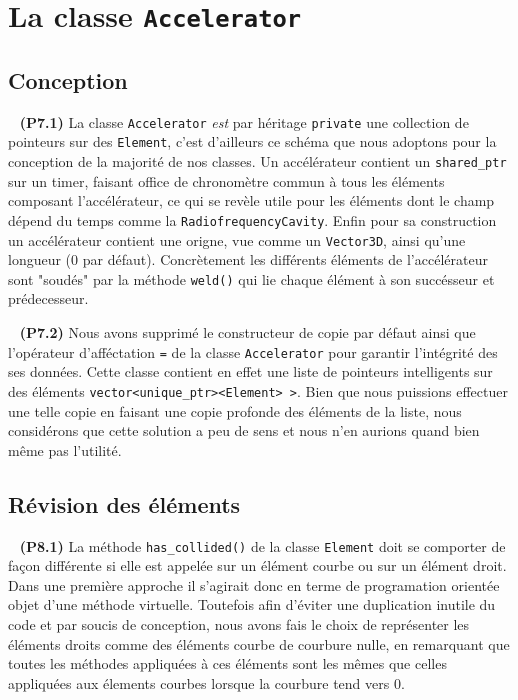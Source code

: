 \documentclass[12pt, letterpaper, twoside]{article}
\newcommand{\T}[1]{\texttt{#1}}
\begin{document}
\section{La classe \T{Accelerator}}

\subsection{Conception}

\ \linebreak
\noindent \textbf{(P7.1)} La classe \T{Accelerator} \emph{est} par héritage \T{private} une collection de pointeurs sur des \T{Element}, c'est d'ailleurs ce schéma que nous adoptons pour la conception de la majorité de nos classes. Un accélérateur contient un \T{shared\_ptr} sur un timer, faisant office de chronomètre commun à tous les éléments composant l'accélérateur, ce qui se revèle utile pour les éléments dont le champ dépend du temps comme la \T{RadiofrequencyCavity}. Enfin pour sa construction un accélérateur contient une origne, vue comme un \T{Vector3D}, ainsi qu'une longueur (0 par défaut). Concrètement les différents éléments de l'accélérateur sont "soudés" par la méthode \T{weld()} qui lie chaque élément à son succésseur et prédecesseur.

\ \linebreak
\noindent \textbf{(P7.2)} Nous avons supprimé le constructeur de copie par défaut ainsi que l'opérateur d'afféctation \T{=} de la classe \T{Accelerator} pour garantir l'intégrité des ses données. Cette classe contient en effet une liste de pointeurs intelligents sur des éléments \T{vector<unique\_ptr><Element> >}. Bien que nous puissions effectuer une telle copie en faisant une copie profonde des éléments de la liste, nous considérons que cette solution a peu de sens et nous n'en aurions quand bien même pas l'utilité. 

\subsection{Révision des éléments}

\ \linebreak
\noindent \textbf{(P8.1)} La méthode \T{has\_collided()} de la classe \T{Element} doit se comporter de façon différente si elle est appelée sur un élément courbe ou sur un élément droit. Dans une première approche il s'agirait donc en terme de programation orientée objet d'une méthode virtuelle. Toutefois afin d'éviter une duplication inutile du code et par soucis de conception, nous avons fais le choix de représenter les éléments droits comme des éléments courbe de courbure nulle, en remarquant que toutes les méthodes appliquées à ces éléments sont les mêmes que celles appliquées aux élements courbes lorsque la courbure tend vers 0.
\end{document}
